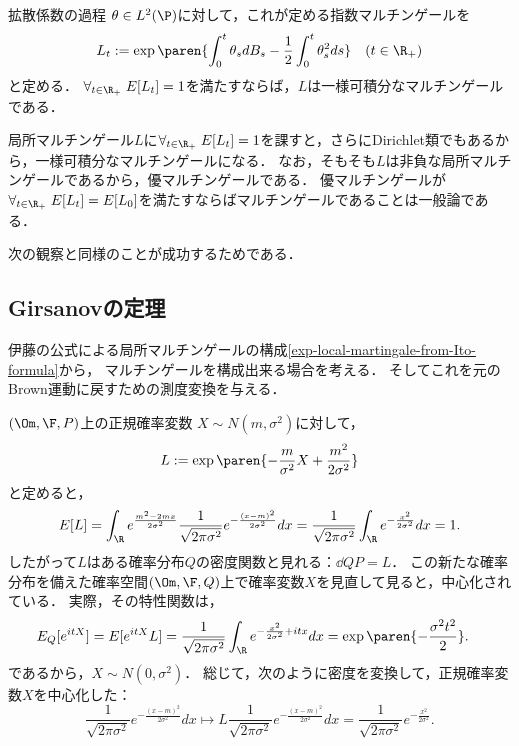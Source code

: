 \documentclass[uplatex,dvipdfmx]{jsreport}
\begin{document}
\begin{lemma}[一般の十分条件]
    拡散係数の過程
    $\theta\in L^2(\P)$に対して，これが定める指数マルチンゲールを
    \[L_t:=\exp\paren{\int^t_0\theta_sdB_s-\frac{1}{2}\int^t_0\theta^2_sds}\quad(t\in\R_+)\]
    と定める．
    $\forall_{t\in\R_+}\;E[L_t]=1$を満たすならば，$L$は一様可積分なマルチンゲールである．
\end{lemma}
\begin{Proof}
    局所マルチンゲール$L$に$\forall_{t\in\R_+}\;E[L_t]=1$を課すと，さらにDirichlet類でもあるから，一様可積分なマルチンゲールになる．
    なお，そもそも$L$は非負な局所マルチンゲールであるから，優マルチンゲールである．
    優マルチンゲールが$\forall_{t\in\R_+}\;E[L_t]=E[L_0]$を満たすならばマルチンゲールであることは一般論である．
\end{Proof}
\begin{remarks}
    次の観察と同様のことが成功するためである．
\end{remarks}

\subsection{Girsanovの定理}

\begin{tcolorbox}[colframe=ForestGreen, colback=ForestGreen!10!white,breakable,colbacktitle=ForestGreen!40!white,coltitle=black,fonttitle=\bfseries\sffamily,
title=]
    伊藤の公式による局所マルチンゲールの構成\ref{exp-local-martingale-from-Ito-formula}から，
    マルチンゲールを構成出来る場合を考える．
    そしてこれを元のBrown運動に戻すための測度変換を与える．
\end{tcolorbox}

\begin{observation}[正規確率変数を中心化する測度変換の与え方]
    $(\Om,\F,P)$上の正規確率変数
    $X\sim N(m,\sigma^2)$に対して，
    \[L:=\exp\paren{-\frac{m}{\sigma^2}X+\frac{m^2}{2\sigma^2}}\]
    と定めると，
    \[E[L]=\int_\R e^{\frac{m^2-2mx}{2\sigma^2}}\frac{1}{\sqrt{2\pi\sigma^2}}e^{-\frac{(x-m)^2}{2\sigma^2}}dx=\frac{1}{\sqrt{2\pi\sigma^2}}\int_\R e^{-\frac{x^2}{2\sigma^2}}dx=1.\]
    したがって$L$はある確率分布$Q$の密度関数と見れる：$\dd{Q}{P}=L$．
    この新たな確率分布を備えた確率空間$(\Om,\F,Q)$上で確率変数$X$を見直して見ると，中心化されている．
    実際，その特性関数は，
    \begin{align*}
        E_Q[e^{itX}]&=E[e^{itX}L]=\frac{1}{\sqrt{2\pi\sigma^2}}\int_\R e^{-\frac{x^2}{2\sigma^2}+itx}dx=\exp\paren{-\frac{\sigma^2t^2}{2}}.
    \end{align*}
    であるから，$X\sim N(0,\sigma^2)$．
    総じて，次のように密度を変換して，正規確率変数$X$を中心化した：
    \[\frac{1}{\sqrt{2\pi\sigma^2}}e^{-\frac{(x-m)^2}{2\sigma^2}}dx\mapsto L\frac{1}{\sqrt{2\pi\sigma^2}}e^{-\frac{(x-m)^2}{2\sigma^2}}dx=\frac{1}{\sqrt{2\pi\sigma^2}}e^{-\frac{x^2}{2\sigma^2}}.\]
\end{observation}
\end{document}
